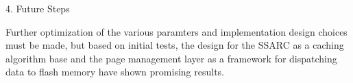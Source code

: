 \documentclass[11pt]{article}
\begin{document}
4. Future Steps

Further optimization of the various paramters and implementation design choices must be made, but based on initial tests, the design for the SSARC as a caching algorithm base and the page management layer as a framework for dispatching data to flash memory have shown promising results.


{}

\end{document}
